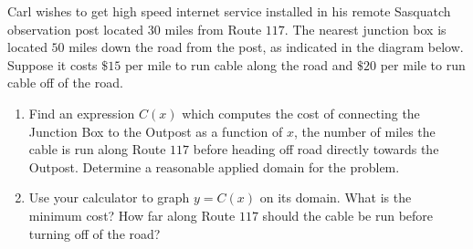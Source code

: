 \documentclass{ximera}
\begin{document}
\begin{example} \label{SasquatchCable} Carl wishes to get high speed internet service installed in his remote Sasquatch observation post located $30$ miles from Route $117$. The nearest junction box is located $50$ miles down the road from the post, as indicated in the diagram below.  Suppose it costs $\$ 15$ per mile to run cable along the road and $\$ 20$ per mile to run cable off of the road.

\begin{enumerate}

\item   Find an expression $C(x)$ which computes the cost of connecting the Junction Box to the Outpost as a function of $x$, the number of miles the cable is run along Route $117$ before heading off road directly towards the Outpost.  Determine a reasonable applied domain for the problem.

\item  Use your calculator to graph $y=C(x)$ on its domain.  What is the minimum cost?  How far along Route $117$ should the cable be run before turning off of the road?

\end{enumerate}

\begin{center}
% 


\end{center}
\end{example}
\end{document}
